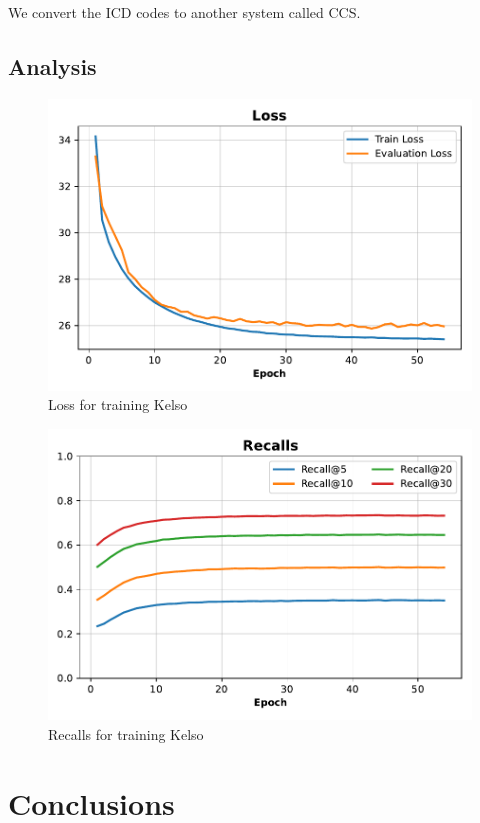 \documentclass[]{marticle}
\begin{document}
We convert the ICD codes to another system called CCS. 

\subsection{Analysis}

\begin{figure}[ht] 
\center
\includegraphics{kelso-train-loss.pdf}
\caption{Loss for training Kelso} 
\end{figure}

\begin{figure}[ht] 
\center
\includegraphics{kelso-train-recall.pdf}
\caption{Recalls for training Kelso} 
\end{figure}

\section{Conclusions}



\end{document}
